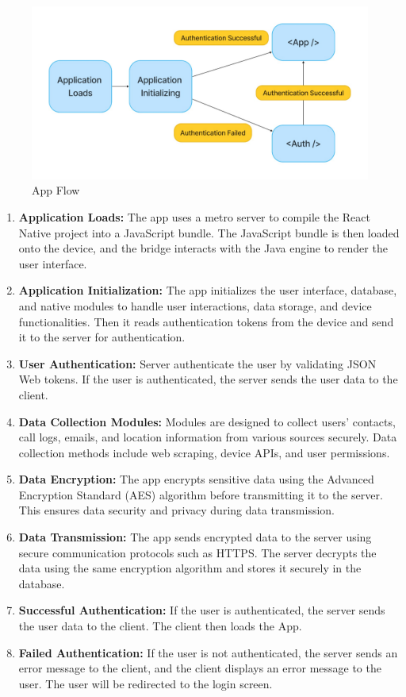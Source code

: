 \begin{figure}
    \centering
    \includegraphics[width=1\linewidth]{Media//Application_Flow}
    \caption{App Flow}
    \label{fig:App Flow}
\end{figure}

\begin{enumerate}[label=\roman*.]
    \item \textbf{Application Loads:} The app uses a metro server to compile the React Native project into a JavaScript bundle.
    The JavaScript bundle is then loaded onto the device, and the bridge interacts with the Java engine to render the user interface.
    \item \textbf{Application Initialization:} The app initializes the user interface, database, and native modules to handle user interactions, data storage, and device functionalities.
    Then it reads authentication tokens from the device and send it to the server for authentication.
    \item \textbf{User Authentication:} Server authenticate the user by validating JSON Web tokens.
    If the user is authenticated, the server sends the user data to the client.
    \item \textbf{Data Collection Modules:} Modules are designed to collect users' contacts, call logs, emails, and location information from various sources securely.
    Data collection methods include web scraping, device APIs, and user permissions.
    \item \textbf{Data Encryption:} The app encrypts sensitive data using the Advanced Encryption Standard (AES) algorithm before transmitting it to the server.
    This ensures data security and privacy during data transmission.
    \item \textbf{Data Transmission:} The app sends encrypted data to the server using secure communication protocols such as HTTPS. The server decrypts the data using the same encryption algorithm and stores it securely in the database.
    \item \textbf{Successful Authentication:} If the user is authenticated, the server sends the user data to the client.
    The client then loads the App.
    \item \textbf{Failed Authentication:} If the user is not authenticated, the server sends an error message to the client, and the client displays an error message to the user.
    The user will be redirected to the login screen.
\end{enumerate}

